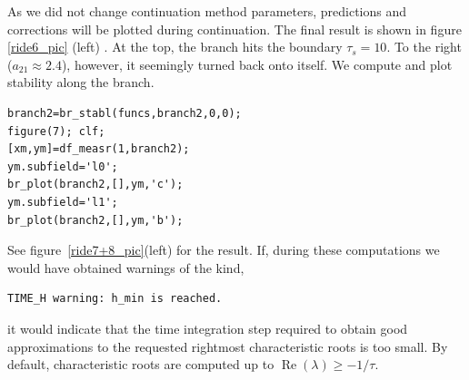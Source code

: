 \documentclass[10pt]{scrartcl}
\renewcommand{\Re}{\operatorname{Re}}
\begin{document}
As we did not change continuation method parameters, predictions and
corrections will be plotted during continuation.  The final result is
shown in figure \ref{ride6_pic} (left) .  At the top, the branch hits the
boundary $\tau_s=10$. To the right ($a_{21}\approx2.4$), however, it
seemingly turned back onto itself.  We compute and plot stability
along the branch.
\begin{lstlisting}
branch2=br_stabl(funcs,branch2,0,0);
figure(7); clf;
[xm,ym]=df_measr(1,branch2);
ym.subfield='l0';
br_plot(branch2,[],ym,'c');
ym.subfield='l1';
br_plot(branch2,[],ym,'b');  
\end{lstlisting}
See figure~\ref{ride7+8_pic}(left) for the result. If, during these
computations we would have obtained warnings of the kind, 
{\small
\begin{verbatim}
TIME_H warning: h_min is reached.
\end{verbatim}}
\noindent it would indicate that the time integration step required to obtain good
approximations to the requested rightmost characteristic roots 
is too small.
By default, characteristic roots are computed 
up to $\Re(\lambda)\geq-1/\tau$.
\end{document}
